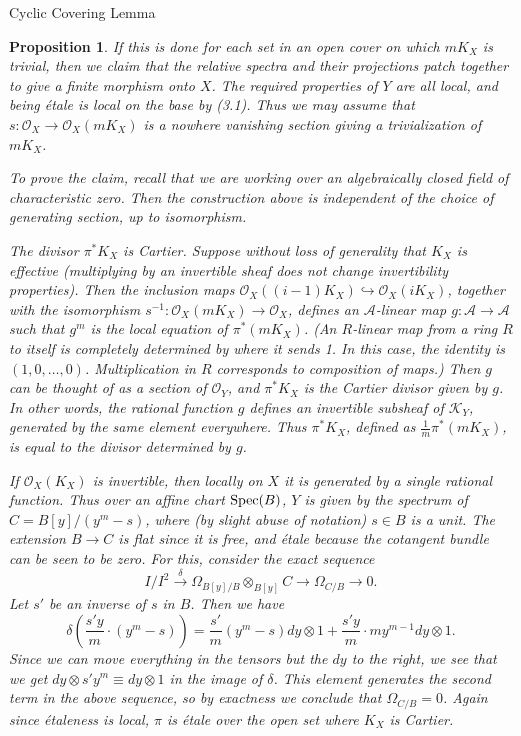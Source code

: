 \documentclass{article}
\newtheorem{proposition}[theorem]{Proposition}
\begin{document}
\begin{section}{Cyclic Covering Lemma}
\begin{proposition}
If this is done for each set in an open cover on which $mK_X$ is trivial, then we claim that the relative spectra and their projections patch together to give a finite morphism onto $X$.  The required properties of $Y$ are all local, and being \'etale is local on the base by (3.1).  Thus we may assume that $s: \mathcal{O}_X \rightarrow \mathcal{O}_X(mK_X)$ is a nowhere vanishing section giving a trivialization of $mK_X$.

To prove the claim, recall that we are working over an algebraically closed field of characteristic zero.  Then the construction above is independent of the choice of generating section, up to isomorphism.

The divisor $\pi^*K_X$ is Cartier.  Suppose without loss of generality that $K_X$ is effective (multiplying by an invertible sheaf does not change invertibility properties).  Then the inclusion maps $\mathcal{O}_X((i-1)K_X) \hookrightarrow \mathcal{O}_X(iK_X)$, together with the isomorphism $s^{-1} : \mathcal{O}_X(mK_X) \rightarrow \mathcal{O}_X$, defines an $\mathcal{A}$-linear map $g: \mathcal{A} \rightarrow \mathcal{A}$ such that $g^m$ is the local equation of $\pi^*(mK_X)$.  (An $R$-linear map from a ring $R$ to itself is completely determined by where it sends 1.  In this case, the identity is $(1,0,\ldots,0)$.  Multiplication in $R$ corresponds to composition of maps.)  Then $g$ can be thought of as a section of $\mathcal{O}_Y$, and $\pi^*K_X$ is the Cartier divisor given by $g$.  In other words, the rational function $g$ defines an invertible subsheaf of $\mathcal{K}_Y$, generated by the same element everywhere.  Thus $\pi^*K_X$, defined as $\frac{1}{m}\pi^*(mK_X)$, is equal to the divisor determined by $g$.

If $\mathcal{O}_X(K_X)$ is invertible, then locally on $X$ it is generated by a single rational function.  Thus over an affine chart $\textnormal{Spec}(B)$, $Y$ is given by the spectrum of $C = B[y]/(y^m-s)$, where (by slight abuse of notation) $s \in B$ is a unit.  The extension $B \rightarrow C$ is flat since it is free, and \'etale because the cotangent bundle can be seen to be zero.  For this, consider the exact sequence $$I/I^2 \stackrel{\delta}{\rightarrow} \Omega_{B[y]/B} \otimes_{B[y]} C \rightarrow \Omega_{C/B} \rightarrow 0.$$  Let $s'$ be an inverse of $s$ in $B$.  Then we have $$\delta(\frac{s'y}{m} \cdot (y^m - s)) = \frac{s'}{m}(y^m -s)dy \otimes 1 + \frac{s'y}{m} \cdot my^{m-1} dy \otimes 1.$$  Since we can move everything in the tensors but the $dy$ to the right, we see that we get $dy \otimes s'y^m \equiv dy \otimes 1$ in the image of $\delta$.  This element generates the second term in the above sequence, so by exactness we conclude that $\Omega_{C/B} = 0$.  Again since \'etaleness is local, $\pi$ is \'etale over the open set where $K_X$ is Cartier.


\end{proposition}
\end{section}
\end{document}
